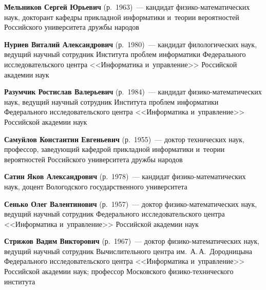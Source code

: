 \begin{multicols}{2}
\vspace*{3pt}

\noindent
\textbf{Мельников Сергей Юрьевич} (р.\ 1963)~--- кандидат фи\-зи\-ко-ма\-те\-ма\-ти\-че\-ских 
наук, докторант кафедры прикладной информатики и~теории вероятностей Российского 
университета дружбы народов

\vspace*{3pt}

\noindent
\textbf{Нуриев Виталий Александрович} (р.\ 1980)~--- кандидат филологических наук, ведущий 
научный
сотрудник Института проблем информатики Федерально\-го исследовательского центра
<<Информатика и~управ\-ле\-ние>> Российской академии наук

\vspace*{3pt}

\noindent
\textbf{Разумчик Ростислав Валерьевич} (р.\ 1984)~--- кандидат 
фи\-зи\-ко-ма\-те\-ма\-ти\-че\-ских наук, ведущий научный сотрудник Института проб\-лем информатики Федерального 
исследовательского центра <<Информатика и~управление>> Российской академии наук

\vspace*{3pt}

\noindent
\textbf{Самуйлов Константин Евгеньевич} (р.\ 1955)~--- доктор технических наук, профессор, 
заведующий ка\-фед\-рой прикладной информатики и~теории вероятностей Российского 
университета дружбы народов

\vspace*{3pt}

\noindent
\textbf{Сатин Яков Александрович} (р.\ 1978)~--- кандидат 
фи\-зи\-ко-ма\-те\-ма\-ти\-че\-ских наук, доцент Вологодского государственного университета


\columnbreak

\noindent
\textbf{Сенько Олег Валентинович} (р.\ 1957)~--- доктор фи\-зи\-ко-ма\-те\-ма\-ти\-че\-ских наук, 
ведущий научный сотрудник Федерального исследовательского центра <<Информатика 
и~управление>> Российской академии наук

\vspace*{3.5pt}

\noindent
\textbf{Стрижов Вадим Викторович} (р.\ 1967)~--- доктор фи\-зи\-ко-ма\-те\-ма\-ти\-че\-ских 
наук, ведущий научный сотрудник Вычислительного центра им.\ А.\,А.~Дородницына 
Федерального исследовательского центра <<Информатика и~управ\-ле\-ние>> Российской 
академии наук; профессор Московского фи\-зи\-ко-тех\-ни\-че\-ско\-го института


\end{multicols}
